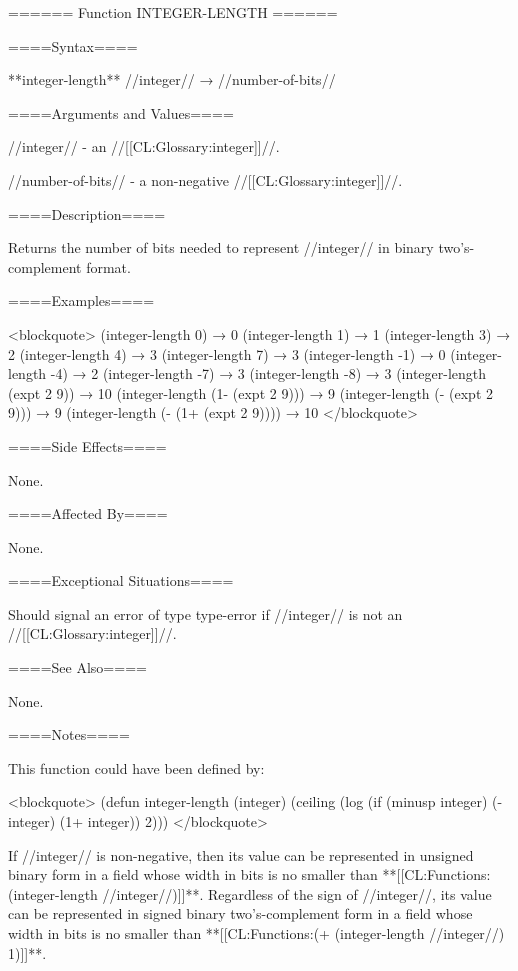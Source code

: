 ====== Function INTEGER-LENGTH ======

====Syntax====

**integer-length** //integer// → //number-of-bits//

====Arguments and Values====

//integer// - an //[[CL:Glossary:integer]]//.

//number-of-bits// - a non-negative //[[CL:Glossary:integer]]//.

====Description====

Returns the number of bits needed to represent //integer// in binary two's-complement format.

====Examples====

<blockquote> (integer-length 0) → 0 (integer-length 1) → 1 (integer-length 3) → 2 (integer-length 4) → 3 (integer-length 7) → 3 (integer-length -1) → 0 (integer-length -4) → 2 (integer-length -7) → 3 (integer-length -8) → 3 (integer-length (expt 2 9)) → 10 (integer-length (1- (expt 2 9))) → 9 (integer-length (- (expt 2 9))) → 9 (integer-length (- (1+ (expt 2 9)))) → 10 </blockquote>

====Side Effects====

None.

====Affected By====

None.

====Exceptional Situations====

Should signal an error of type type-error if //integer// is not an //[[CL:Glossary:integer]]//.

====See Also====

None.

====Notes====

This function could have been defined by:

<blockquote> (defun integer-length (integer) (ceiling (log (if (minusp integer) (- integer) (1+ integer)) 2))) </blockquote>

If //integer// is non-negative, then its value can be represented in unsigned binary form in a field whose width in bits is no smaller than **[[CL:Functions:(integer-length //integer//)]]**. Regardless of the sign of //integer//, its value can be represented in signed binary two's-complement form in a field whose width in bits is no smaller than **[[CL:Functions:(+ (integer-length //integer//) 1)]]**.

